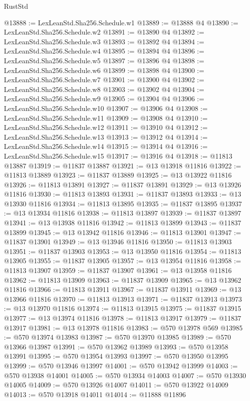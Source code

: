 \begin{lexlean}{RustStd}
\begin{coremodule}
@13888 := LexLeanStd.Sha256.Schedule.w1
@13889 := @13888 @4
@13890 := LexLeanStd.Sha256.Schedule.w2
@13891 := @13890 @4
@13892 := LexLeanStd.Sha256.Schedule.w3
@13893 := @13892 @4
@13894 := LexLeanStd.Sha256.Schedule.w4
@13895 := @13894 @4
@13896 := LexLeanStd.Sha256.Schedule.w5
@13897 := @13896 @4
@13898 := LexLeanStd.Sha256.Schedule.w6
@13899 := @13898 @4
@13900 := LexLeanStd.Sha256.Schedule.w7
@13901 := @13900 @4
@13902 := LexLeanStd.Sha256.Schedule.w8
@13903 := @13902 @4
@13904 := LexLeanStd.Sha256.Schedule.w9
@13905 := @13904 @4
@13906 := LexLeanStd.Sha256.Schedule.w10
@13907 := @13906 @4
@13908 := LexLeanStd.Sha256.Schedule.w11
@13909 := @13908 @4
@13910 := LexLeanStd.Sha256.Schedule.w12
@13911 := @13910 @4
@13912 := LexLeanStd.Sha256.Schedule.w13
@13913 := @13912 @4
@13914 := LexLeanStd.Sha256.Schedule.w14
@13915 := @13914 @4
@13916 := LexLeanStd.Sha256.Schedule.w15
@13917 := @13916 @4
@13918 := @11813 @13887
@13919 := @11837 @13887
@13921 := @13 @13918 @11816
@13922 := @11813 @13889
@13923 := @11837 @13889
@13925 := @13 @13922 @11816
@13926 := @11813 @13891
@13927 := @11837 @13891
@13929 := @13 @13926 @11816
@13930 := @11813 @13893
@13931 := @11837 @13893
@13933 := @13 @13930 @11816
@13934 := @11813 @13895
@13935 := @11837 @13895
@13937 := @13 @13934 @11816
@13938 := @11813 @13897
@13939 := @11837 @13897
@13941 := @13 @13938 @11816
@13942 := @11813 @13899
@13943 := @11837 @13899
@13945 := @13 @13942 @11816
@13946 := @11813 @13901
@13947 := @11837 @13901
@13949 := @13 @13946 @11816
@13950 := @11813 @13903
@13951 := @11837 @13903
@13953 := @13 @13950 @11816
@13954 := @11813 @13905
@13955 := @11837 @13905
@13957 := @13 @13954 @11816
@13958 := @11813 @13907
@13959 := @11837 @13907
@13961 := @13 @13958 @11816
@13962 := @11813 @13909
@13963 := @11837 @13909
@13965 := @13 @13962 @11816
@13966 := @11813 @13911
@13967 := @11837 @13911
@13969 := @13 @13966 @11816
@13970 := @11813 @13913
@13971 := @11837 @13913
@13973 := @13 @13970 @11816
@13974 := @11813 @13915
@13975 := @11837 @13915
@13977 := @13 @13974 @11816
@13978 := @11813 @13917
@13979 := @11837 @13917
@13981 := @13 @13978 @11816
@13983 := @570 @13978 @569
@13985 := @570 @13974 @13983
@13987 := @570 @13970 @13985
@13989 := @570 @13966 @13987
@13991 := @570 @13962 @13989
@13993 := @570 @13958 @13991
@13995 := @570 @13954 @13993
@13997 := @570 @13950 @13995
@13999 := @570 @13946 @13997
@14001 := @570 @13942 @13999
@14003 := @570 @13938 @14001
@14005 := @570 @13934 @14003
@14007 := @570 @13930 @14005
@14009 := @570 @13926 @14007
@14011 := @570 @13922 @14009
@14013 := @570 @13918 @14011
@14014 := @11888 @11896

\end{coremodule}
\end{lexlean}

